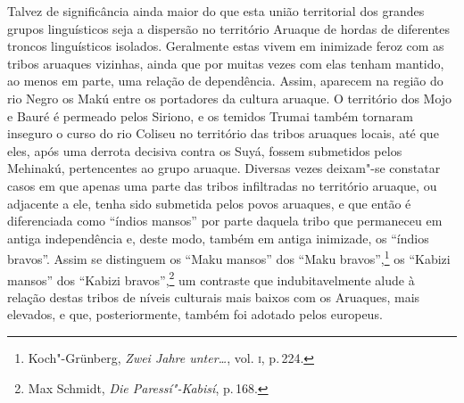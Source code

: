 Talvez de significância ainda maior do que esta união territorial dos
grandes grupos linguísticos seja a dispersão no território Aruaque de
hordas de diferentes troncos linguísticos isolados. Geralmente estas
vivem em inimizade feroz com as tribos aruaques vizinhas, ainda que por muitas
vezes com elas tenham mantido, ao menos em parte, uma relação de
dependência. Assim, aparecem na região do rio Negro os Makú
entre os portadores da cultura aruaque. O território dos Mojo e Bauré é
permeado pelos Siriono, e os temidos Trumai também tornaram inseguro o
curso do rio Coliseu no território das tribos aruaques locais, até que
eles, após uma derrota decisiva contra os Suyá, fossem submetidos pelos
Mehinakú, pertencentes ao grupo aruaque. Diversas vezes deixam"-se
constatar casos em que apenas uma parte das tribos infiltradas no
território aruaque, ou adjacente a ele, tenha sido submetida pelos povos aruaques, e
que então é diferenciada como ``índios mansos'' por parte daquela tribo
que permaneceu em antiga independência e, deste modo, também em antiga
inimizade, os ``índios bravos''. Assim se distinguem os ``Maku mansos''
dos ``Maku bravos'',\footnote{Koch"-Grünberg, \textit{Zwei Jahre unter\ldots}, vol. \textsc{i}, p.\,224.} os ``Kabizi mansos'' dos ``Kabizi
bravos'',\footnote{Max Schmidt, \textit{Die Paressí"-Kabisí}, p.\,168.}
um contraste que indubitavelmente alude à relação destas tribos de
níveis culturais mais baixos com os Aruaques, mais elevados, e que, posteriormente, 
também foi adotado pelos europeus.

